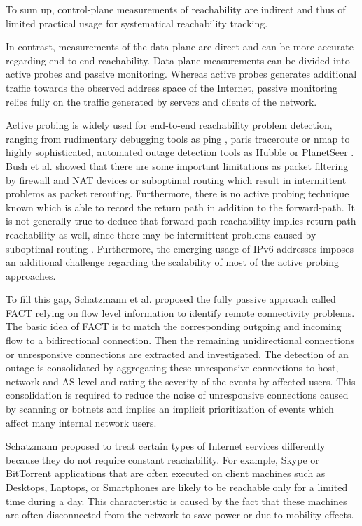\documentclass{sigcomm-alternate}
\begin{document}
To sum up, control-plane measurements of reachability are indirect
and thus of limited practical usage for systematical reachability
tracking.

In contrast, measurements of the data-plane are direct and can be
more accurate regarding end-to-end reachability. Data-plane
measurements can be divided into active probes and passive monitoring.
Whereas active probes generates additional traffic towards the
observed address space of the Internet, passive monitoring relies
fully on the traffic generated by servers and clients of the network.

Active probing is widely used for end-to-end reachability problem
detection, ranging from rudimentary debugging tools as ping
\cite{PING}, paris traceroute \cite{traceroute} or nmap \cite{Nmap}
to highly sophisticated, automated outage detection tools as Hubble
\cite{Katz:2008} or PlanetSeer \cite{Zhang:2004}. Bush et al.\cite{Bush:Optometry}
showed that there are some important limitations as packet filtering
by firewall and NAT devices or suboptimal routing which result in
intermittent problems as packet rerouting. Furthermore, there is
no active probing technique known which is able to record the return
path in addition to the forward-path. It is not generally true to
deduce that forward-path reachability implies return-path reachability
as well, since there may be intermittent problems caused by suboptimal
routing \cite{Bush:Optometry}. Furthermore, the emerging usage of IPv6
addresses imposes an additional challenge regarding the scalability of
most of the active probing approaches.

To fill this gap, Schatzmann et al. proposed the fully
passive approach called FACT\cite{SchatzmannPAM2011} relying on flow level information to
identify remote connectivity problems. The basic idea of FACT is to
match the corresponding outgoing and incoming flow to a bidirectional
connection. Then the remaining unidirectional connections or unresponsive
connections are extracted and investigated. The detection of an outage
is consolidated by aggregating these unresponsive connections to host,
network and AS level and rating the severity of the events by affected
users. This consolidation is required to reduce the noise of unresponsive
connections caused by scanning or botnets and implies an
implicit prioritization of events which affect many internal network
users.

Schatzmann\cite{SchatzmanThesis2012} proposed to treat certain types 
of Internet services differently because they do not require constant 
reachability. For example, Skype or BitTorrent applications that
are often executed on client machines such as Desktops, Laptops, or
Smartphones are likely to be reachable only for a limited time during a day.
This characteristic is caused by the fact that these machines are often
disconnected from the network to save power or due to mobility effects.
\end{document}
